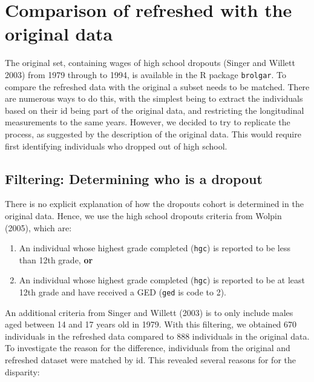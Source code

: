 \documentclass{article}
\begin{document}
\hypertarget{compare}{%
\section{Comparison of refreshed with the original data}\label{compare}}

The original set, containing wages of high school dropouts (Singer and Willett 2003) from 1979 through to 1994, is available in the R package \texttt{brolgar}. To compare the refreshed data with the original a subset needs to be matched. There are numerous ways to do this, with the simplest being to extract the individuals based on their id being part of the original data, and restricting the longitudinal measurements to the same years. However, we decided to try to replicate the process, as suggested by the description of the original data. This would require first identifying individuals who dropped out of high school.

\hypertarget{filtering-determining-who-is-a-dropout}{%
\subsection{Filtering: Determining who is a dropout}\label{filtering-determining-who-is-a-dropout}}

There is no explicit explanation of how the dropouts cohort is determined in the original data. Hence, we use the high school dropouts criteria from Wolpin (2005), which are:

\begin{enumerate}
\def\labelenumi{\arabic{enumi}.}
\tightlist
\item
  An individual whose highest grade completed (\texttt{hgc}) is reported to be less than 12th grade, \textbf{or}
\item
  An individual whose highest grade completed (\texttt{hgc}) is reported to be at least 12th grade and have received a GED (\texttt{ged} is code to 2).
\end{enumerate}

An additional criteria from Singer and Willett (2003) is to only include males aged between 14 and 17 years old in 1979. With this filtering, we obtained 670 individuals in the refreshed data compared to 888 individuals in the original data. To investigate the reason for the difference, individuals from the original and refreshed dataset were matched by id. This revealed several reasons for for the disparity:
\end{document}
